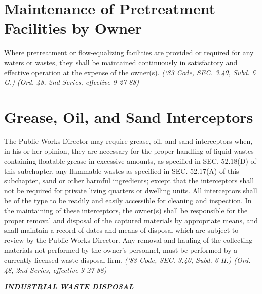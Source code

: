 \documentclass[code.tex]{subfiles}
\begin{document}
\section{Maintenance of Pretreatment Facilities by Owner}
Where pretreatment or flow-equalizing facilities are provided or required for any waters or wastes, they shall be maintained continuously in satisfactory and effective operation at the expense of the owner(s).\newline
\emph{(‘83 Code, SEC. 3.40, Subd. 6 G.) (Ord. 48, 2nd Series, effective 9-27-88)}
\section{Grease, Oil, and Sand Interceptors}
The Public Works Director may require grease, oil, and sand interceptors when, in his or her opinion, they are necessary for the proper handling of liquid wastes containing floatable grease in excessive amounts, as specified in SEC. 52.18(D) of this subchapter, any flammable wastes as specified in SEC. 52.17(A) of this subchapter, sand or other harmful ingredients; except that the interceptors shall not be required for private living quarters or dwelling units.  All interceptors shall be of the type to be readily and easily accessible for cleaning and inspection.  In the maintaining of these interceptors, the owner(s) shall be responsible for the proper removal and disposal of the captured materials by appropriate means, and shall maintain a record of dates and means of disposal which are subject to review by the Public Works Director.  Any removal and hauling of the collecting materials not performed by the owner’s personnel, must be performed by a currently licensed waste disposal firm.\newline
\emph{(‘83 Code, SEC. 3.40, Subd. 6 H.) (Ord. 48, 2nd Series, effective 9-27-88)}\newline


\begin{center}
\emph{\textbf{\LARGE{INDUSTRIAL WASTE DISPOSAL}}}
\end{center}

\setcounter{section}{34}
\end{document}
